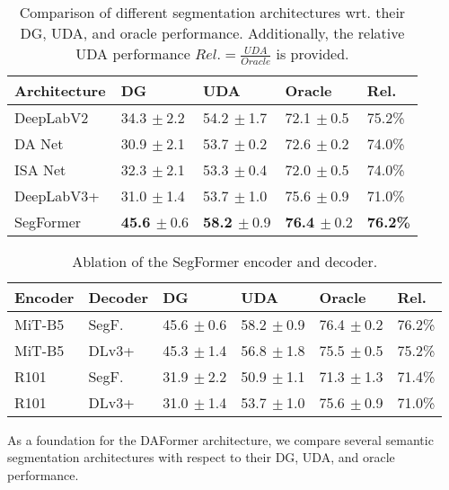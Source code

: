 \documentclass[journal,compsoc]{IEEEtran}
\newcommand{\spm}[1]{\tiny{$\,\pm$#1}}
\begin{document}
\begin{table}
\centering
\caption{
Comparison of different segmentation architectures wrt. their DG, UDA, and oracle performance.
Additionally, the relative UDA performance $\mathit{Rel.} = \frac{\mathit{UDA}}{\mathit{Oracle}}$ is provided. 
}
\label{tab:basic_architecture_comparison}
\footnotesize
\begin{tabular}{lllll}
\toprule
    Architecture &       DG &           UDA &         Oracle &   Rel. \\
\midrule
    DeepLabV2~\cite{chen2017deeplab} & 34.3\spm{2.2} & 54.2\spm{1.7} & 72.1\spm{0.5} & 75.2\% \\
        DA Net~\cite{fu2019dual} & 30.9\spm{2.1} & 53.7\spm{0.2} & 72.6\spm{0.2} & 74.0\% \\
        ISA Net~\cite{huang2019interlaced} & 32.3\spm{2.1} & 53.3\spm{0.4} & 72.0\spm{0.5} & 74.0\% \\
    DeepLabV3+~\cite{chen2018encoder} & 31.0\spm{1.4} & 53.7\spm{1.0} & 75.6\spm{0.9} & 71.0\% \\
    SegFormer~\cite{xie2021segformer} & \textbf{45.6}\spm{0.6} & \textbf{58.2}\spm{0.9} & \textbf{76.4}\spm{0.2} & \textbf{76.2\%} \\
\bottomrule
\end{tabular}
\end{table} 
\begin{table}
\centering
\caption{Ablation of the SegFormer encoder and decoder.}
\label{tab:encoder_decoder}
\footnotesize
\setlength{\tabcolsep}{5pt}
\begin{tabular}{llllll}
\toprule
    Encoder &             Decoder &           DG & UDA &         Oracle &   Rel. \\
\midrule
    MiT-B5~\cite{xie2021segformer} &           SegF.~\cite{xie2021segformer} & 45.6\spm{0.6} & 58.2\spm{0.9} & 76.4\spm{0.2} & 76.2\% \\
    MiT-B5~\cite{xie2021segformer} &           DLv3+~\cite{chen2018encoder} & 45.3\spm{1.4} & 56.8\spm{1.8} & 75.5\spm{0.5} & 75.2\% \\
    R101~\cite{he2016deep} &           SegF.~\cite{xie2021segformer} & 31.9\spm{2.2} & 50.9\spm{1.1} & 71.3\spm{1.3} & 71.4\% \\
    R101~\cite{he2016deep} &           DLv3+~\cite{chen2018encoder} & 31.0\spm{1.4} & 53.7\spm{1.0} & 75.6\spm{0.9} & 71.0\% \\
\bottomrule
\end{tabular}
\end{table} 
As a foundation for the DAFormer architecture, we compare several semantic segmentation architectures with respect to their DG, UDA, and oracle performance.
\end{document}
